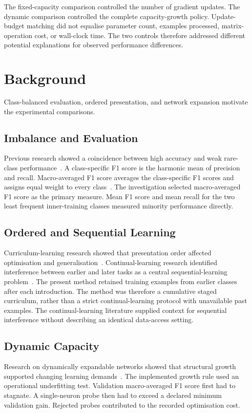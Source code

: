 \documentclass[conference,10pt]{IEEEtran}
\begin{document}
The fixed-capacity comparison controlled the number of gradient updates. The dynamic comparison controlled the complete capacity-growth policy. Update-budget matching did not equalise parameter count, examples processed, matrix-operation cost, or wall-clock time. The two controls therefore addressed different potential explanations for observed performance differences.

\section{Background}
Class-balanced evaluation, ordered presentation, and network expansion motivate the experimental comparisons.

\subsection{Imbalance and Evaluation}
Previous research showed a coincidence between high accuracy and weak rare-class performance~\cite{he2009learning}. A class-specific F1 score is the harmonic mean of precision and recall. Macro-averaged F1 score averages the class-specific F1 scores and assigns equal weight to every class~\cite{sokolova2009systematic}. The investigation selected macro-averaged F1 score as the primary measure. Mean F1 score and mean recall for the two least frequent inner-training classes measured minority performance directly.

\subsection{Ordered and Sequential Learning}
Curriculum-learning research showed that presentation order affected optimisation and generalisation~\cite{bengio2009curriculum}. Continual-learning research identified interference between earlier and later tasks as a central sequential-learning problem~\cite{parisi2019continual}. The present method retained training examples from earlier classes after each introduction. The method was therefore a cumulative staged curriculum, rather than a strict continual-learning protocol with unavailable past examples. The continual-learning literature supplied context for sequential interference without describing an identical data-access setting.

\subsection{Dynamic Capacity}
Research on dynamically expandable networks showed that structural growth supported changing learning demands~\cite{yoon2018den}. The implemented growth rule used an operational underfitting test. Validation macro-averaged F1 score first had to stagnate. A single-neuron probe then had to exceed a declared minimum validation gain. Rejected probes contributed to the recorded optimisation cost.
\end{document}
